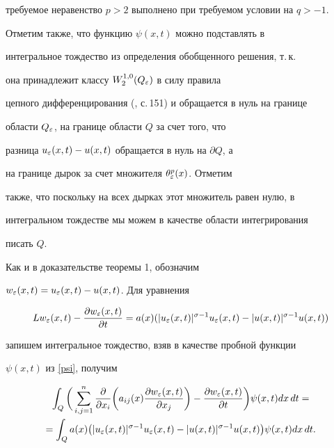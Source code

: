 \begin{pf}
требуемое неравенство $p>2$ выполнено при требуемом условии на $q>-1$.


Отметим также, что функцию $\psi(x,t)$ можно подставлять в


интегральное тождество из определения обобщенного решения, т.\,к.


она принадлежит классу $W^{1,0}_{2}(Q_{\varepsilon})$ в силу правила


цепного дифференцирования (\cite{GT}, с.\,151) и обращается в нуль на границе


области $Q_{\varepsilon}$, на границе области $Q$ за счет того, что


разница $u_\varepsilon(x,t)-u(x,t)$ обращается в нуль на $\partial Q$, а


на границе дырок за счет множителя $\theta_\varepsilon^p(x)$. Отметим


также, что поскольку на всех дырках этот множитель равен нулю, в


интегральном тождестве мы можем в качестве области интегрирования


писать $Q$.





Как и в доказательстве теоремы 1, обозначим


$w_\varepsilon(x,t)=u_\varepsilon(x,t)-u(x,t)$. Для уравнения


$$


Lw_\eps(x,t)-\frac {\dd w_\eps(x,t)}{\dd t}=a(x)


(|u_\eps(x,t)|^{\sigma-1}u_\eps(x,t)-|u(x,t)|^{\sigma-1}u(x,t))


$$


запишем интегральное тождество, взяв в качестве пробной функции


$\psi(x,t)$ из \eqref{psi}, получим


\begin{multline}


\int_{Q}\bigg(\stdsum\frac{\dd}{\dd x_i}\bigg(a_{ij}(x)


\frac{\dd w_\eps(x,t)}{\dd x_j}\bigg)-\frac {\dd


w_\eps(x,t)}{\dd t}\bigg)\psi(x,t)dx\,dt=\\


=\int_{Q}a(x)\big(|u_\eps(x,t)|^{\sigma-1}


u_\eps(x,t)-|u(x,t)|^{\sigma-1}u(x,t)\big) \psi(x,t) dx\,dt.\label{9}


\end{multline}






\end{pf}
